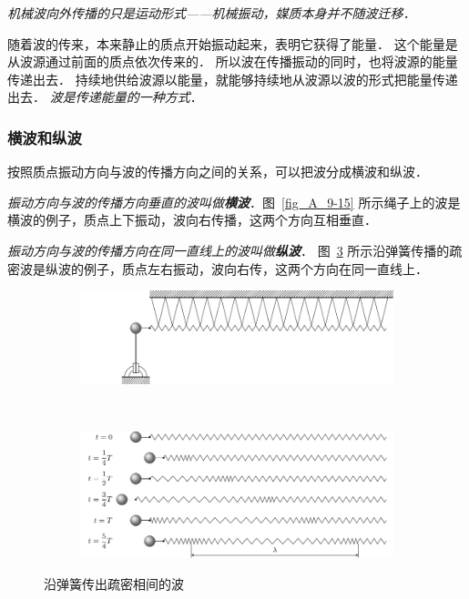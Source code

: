 \textit{机械波向外传播的只是运动形式——机械振动，媒质本身并不随波迁移．}

随着波的传来，本来静止的质点开始振动起来，表明它获得了能量．
这个能量是从波源通过前面的质点依次传来的．
所以波在传播振动的同时，也将波源的能量传递出去．
持续地供给波源以能量，就能够持续地从波源以波的形式把能量传递出去．
\textit{波是传递能量的一种方式}．

\subsubsection{横波和纵波} 

按照质点振动方向与波的传播方向之间的关系，可以把波分成横波和纵波．

\textit{振动方向与波的传播方向垂直的波叫做\textbf{横波}}．图~\ref{fig_A_9-15} 所示绳子上的波是横波的例子，质点上下振动，波向右传播，这两个方向互相垂直．

\textit{振动方向与波的传播方向在同一直线上的波叫做\textbf{纵波}}．
图~\ref{fig_A_9-16} 所示沿弹簧传播的疏密波是纵波的例子，质点左右振动，波向右传，这两个方向在同一直线上．
\begin{figure}[htbp]
    \centering
    \begin{subfigure}{0.8\linewidth}
    	\centering
    	\includegraphics{fig/A/9-16a.pdf}
    	\caption{}\label{fig_A_9-16a}
    \end{subfigure}
    \\
    \begin{subfigure}{0.8\linewidth}
    	\centering
    	\includegraphics{fig/A/9-16b.pdf}
    	\caption{}\label{fig_A_9-16b}
    \end{subfigure}
    \caption{沿弹簧传出疏密相间的波}\label{fig_A_9-16}
\end{figure}



